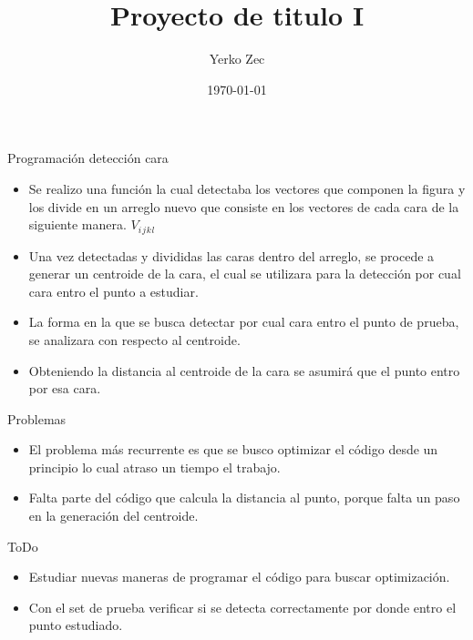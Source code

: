 \documentclass{beamer}
\title{Proyecto de titulo I}
\author{Yerko Zec}
\institute[]{FI - UNAB}
\date{\today}
\begin{document}
\begin{frame}[plain]
  \titlepage
\end{frame}

\addtocounter{framenumber}{-1}

\begin{frame}{Programación detección cara}
\begin{itemize}
    \item Se realizo una función la cual detectaba los vectores que componen la figura y los divide en un arreglo nuevo que consiste en los vectores de cada cara de la siguiente manera.
    $V_i{}_j{}_k{}_l$
    \item Una vez detectadas y divididas las caras dentro del arreglo, se procede a generar un centroide de la cara, el cual se utilizara para la detección por cual cara entro el punto a estudiar.
    
\end{itemize}
\end{frame}

\begin{frame}
 \begin{itemize}
  \item La forma en la que se busca detectar por cual cara entro el punto de prueba, se analizara con respecto al centroide.
  \item Obteniendo la distancia al centroide de la cara se asumirá que el punto entro por esa cara.
 \end{itemize}
\end{frame}


\begin{frame}{Problemas}
  \begin{itemize}
   \item El problema más recurrente es que se busco optimizar el código desde un principio lo cual atraso un tiempo el trabajo.
   \item Falta parte del código que calcula la distancia al punto, porque falta un paso en la generación del centroide.
  \end{itemize}
\end{frame}

\begin{frame}{ToDo}
  \begin{itemize}
   \item Estudiar nuevas maneras de programar el código para buscar optimización.
   \item Con el set de prueba verificar si se detecta correctamente por donde entro el punto estudiado.
  \end{itemize}
\end{frame}


\medskip


\end{document}
